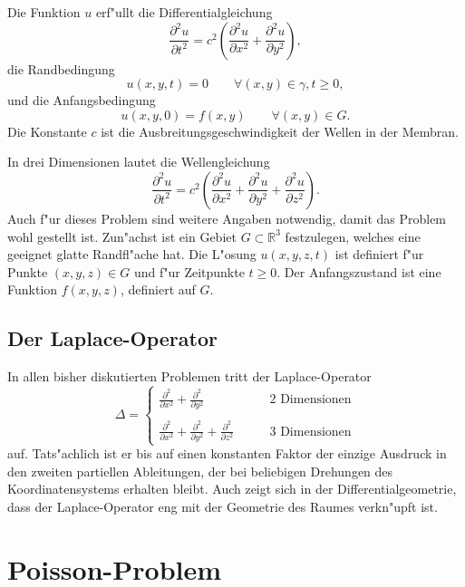 Die Funktion $ u $
erf"ullt die Differentialgleichung
\[
\frac{\partial^2 u }{\partial t^2}
=c^2\left(\frac{\partial^2 u }{\partial x^2}+\frac{\partial^2 u }{\partial y^2}\right),
\]
die Randbedingung
\[
 u (x,y,t)=0\qquad \forall (x,y)\in\gamma,t\ge 0,
\]
und die Anfangsbedingung
\[
 u (x,y,0)=f(x,y)\qquad \forall (x,y)\in G.
\]
Die Konstante $c$ ist die Ausbreitungsgeschwindigkeit der Wellen in der Membran.

In drei Dimensionen lautet
die Wellengleichung 
\[
\frac{\partial^2 u }{\partial t^2}
=c^2\left(\frac{\partial^2 u }{\partial x^2}
+\frac{\partial^2 u }{\partial y^2}
+\frac{\partial^2 u }{\partial z^2}
\right).
\]
Auch f"ur dieses Problem sind weitere Angaben notwendig, damit das Problem
wohl gestellt ist.
Zun"achst ist ein Gebiet $G\subset \mathbb R^3$ festzulegen, welches
eine geeignet glatte Randfl"ache hat.
Die L"osung $ u (x,y,z,t)$ ist definiert f"ur Punkte $(x,y,z)\in G$
und f"ur Zeitpunkte $t\ge 0$.
Der Anfangszustand ist eine Funktion $f(x,y,z)$,
definiert auf $G$.

\subsection{Der Laplace-Operator\label{beispiele:laplaceoperator}}
In allen bisher diskutierten Problemen tritt der Laplace-Operator
\[
\Delta
=
\begin{cases}
\displaystyle
\frac{\partial^2}{\partial x^2}
+\frac{\partial^2}{\partial y^2}&\qquad\text{2 Dimensionen}\\
\\
\displaystyle
\frac{\partial^2}{\partial x^2}
+\frac{\partial^2}{\partial y^2}
+\frac{\partial^2}{\partial z^2}&\qquad\text{3 Dimensionen}
\end{cases}
\]
auf. Tats"achlich ist er bis auf einen konstanten Faktor der einzige Ausdruck
in den zweiten partiellen Ableitungen, der bei beliebigen Drehungen des
Koordinatensystems erhalten bleibt.
Auch zeigt sich in der Differentialgeometrie, dass der Laplace-Operator
eng mit der Geometrie des Raumes verkn"upft ist.

\section{Poisson-Problem}

